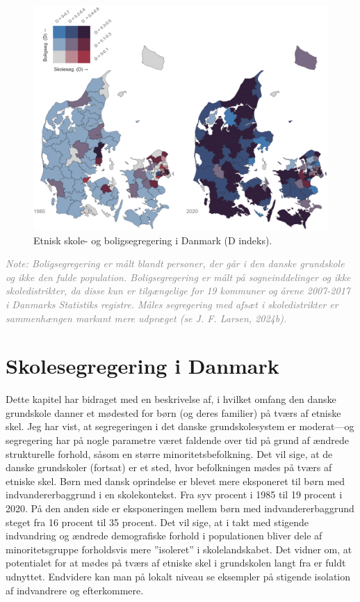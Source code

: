 \documentclass[
]{book}
\begin{document}
\begin{figure}
\includegraphics[width=1\linewidth]{images/Figur5-removebg} \caption{Etnisk skole- og boligsegregering i Danmark (D indeks).}\label{fig:fig-4-4}
\end{figure}

\begin{footnotesize}\textit{\textcolor{gray}{
Note: Boligsegregering er målt blandt personer, der går i den danske grundskole og ikke den fulde population. Boligsegregering er målt på sogneinddelinger og ikke skoledistrikter, da disse kun er tilgængelige for 19 kommuner og årene 2007-2017 i Danmarks Statistiks registre. Måles segregering med afsæt i skoledistrikter er sammenhængen markant mere udpræget (se J. F. Larsen, 2024b).
}}
\end{footnotesize}

\section{Skolesegregering i Danmark}\label{skolesegregering-i-danmark}

Dette kapitel har bidraget med en beskrivelse af, i hvilket omfang den danske grundskole danner et mødested for børn (og deres familier) på tværs af etniske skel. Jeg har vist, at segregeringen i det danske grundskolesystem er moderat---og segregering har på nogle parametre været faldende over tid på grund af ændrede strukturelle forhold, såsom en større minoritetsbefolkning. Det vil sige, at de danske grundskoler (fortsat) er et sted, hvor befolkningen mødes på tværs af etniske skel. Børn med dansk oprindelse er blevet mere eksponeret til børn med indvandererbaggrund i en skolekontekst. Fra syv procent i 1985 til 19 procent i 2020. På den anden side er eksponeringen mellem børn med indvandererbaggrund steget fra 16 procent til 35 procent. Det vil sige, at i takt med stigende indvandring og ændrede demografiske forhold i populationen bliver dele af minoritetsgruppe forholdsvis mere ''isoleret'' i skolelandskabet. Det vidner om, at potentialet for at mødes på tværs af etniske skel i grundskolen langt fra er fuldt udnyttet. Endvidere kan man på lokalt niveau se eksempler på stigende isolation af indvandrere og efterkommere.
\end{document}
